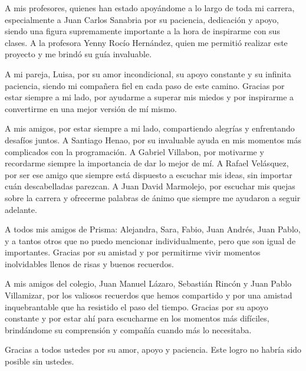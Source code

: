 A mis profesores, quienes han estado apoyándome a lo largo de toda mi carrera, especialmente a Juan Carlos Sanabria por su paciencia, dedicación y apoyo, siendo una figura supremamente importante a la hora de inspirarme con sus clases. A la profesora Yenny Rocío Hernández, quien me permitió realizar este proyecto y me brindó su guía invaluable.

A mi pareja, Luisa, por su amor incondicional, su apoyo constante y su infinita paciencia, siendo mi compañera fiel en cada paso de este camino. Gracias por estar siempre a mi lado, por ayudarme a superar mis miedos y por inspirarme a convertirme en una mejor versión de mí mismo.

A mis amigos, por estar siempre a mi lado, compartiendo alegrías y enfrentando desafíos juntos. A Santiago Henao, por su invaluable ayuda en mis momentos más complicados con la programación. A Gabriel Villabon, por motivarme y recordarme siempre la importancia de dar lo mejor de mí. A Rafael Velásquez, por ser ese amigo que siempre está dispuesto a escuchar mis ideas, sin importar cuán descabelladas parezcan. A Juan David Marmolejo, por escuchar mis quejas sobre la carrera y ofrecerme palabras de ánimo que siempre me ayudaron a seguir adelante. 

A todos mis amigos de Prisma: Alejandra, Sara, Fabio, Juan Andrés, Juan Pablo, y a tantos otros que no puedo mencionar individualmente, pero que son igual de importantes. Gracias por su amistad y por permitirme vivir momentos inolvidables llenos de risas y buenos recuerdos. 

A mis amigos del colegio, Juan Manuel Lázaro, Sebastián Rincón y Juan Pablo Villamizar, por los valiosos recuerdos que hemos compartido y por una amistad inquebrantable que ha resistido el paso del tiempo. Gracias por su apoyo constante y por estar ahí para escucharme en los momentos más difíciles, brindándome su comprensión y compañía cuando más lo necesitaba.

Gracias a todos ustedes por su amor, apoyo y paciencia. Este logro no habría sido posible sin ustedes.
\newpage

